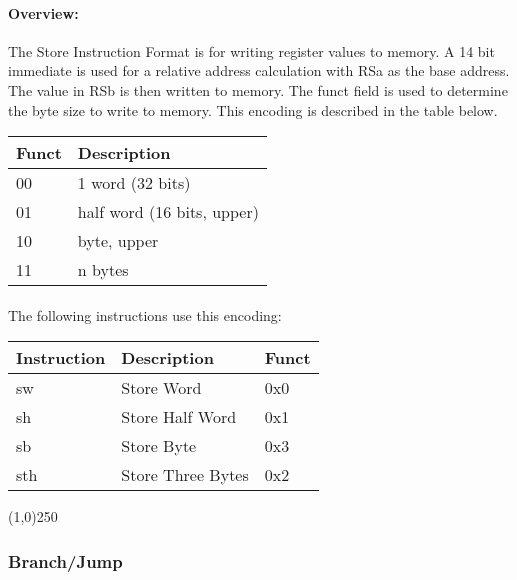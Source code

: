\documentclass[letterpaper, 11pt]{article}
\begin{document}
\paragraph{Overview:}The Store Instruction Format is for writing register values to memory. A 14 bit immediate is used
for a relative address calculation with RSa as the base address. The value in RSb is then written to memory. The funct field is used
to determine the byte size to write to memory. This encoding is described in the table below. \\
	\begin{tabular}{l|l}
		Funct & Description \\ \hline
		00	  & 1 word (32 bits) \\
		01	  & half word (16 bits, upper) \\ 
		10	  & byte, upper \\
		11	  & n bytes		\\
	\end{tabular}
\paragraph{}The following instructions use this encoding: \\

	\begin{center}
		\begin{tabular}{|l|l|l|} \hline
			Instruction & Description 			& Funct\\ \hline
			sw			& Store Word			& 0x0 \\ \hline
			sh			& Store Half Word		& 0x1 \\ \hline
			sb			& Store Byte			& 0x3 \\ \hline
			sth			& Store Three Bytes		& 0x2 \\ \hline

		\end{tabular}
	\end{center}

\begin{center}
	\line(1,0){250}
\end{center}

\newpage
\subsubsection{Branch/Jump}
\end{document}
